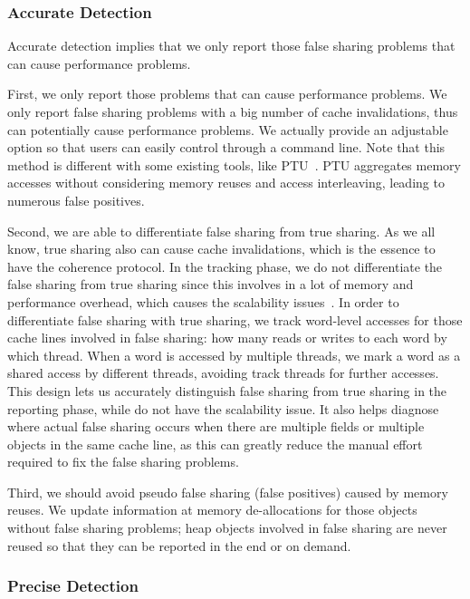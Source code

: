 \subsubsection{Accurate Detection}
\label{sec:accuratedetect}

Accurate detection implies that we only report those false sharing problems that can cause performance problems. 

First, we only report those problems that can cause performance problems. We only report false sharing problems with a big number of cache invalidations, thus can potentially cause performance problems. We actually provide an adjustable option so that users can easily control through a command line. Note that this method is different with some existing tools, like PTU~\cite{detect:ptu, detect:intel}. PTU aggregates memory accesses without considering memory reuses and access interleaving, leading to numerous false positives. 

Second, we are able to differentiate false sharing from true sharing. As we all know, true sharing also can cause cache invalidations, which is the essence to have the coherence protocol. In the tracking phase, we do not differentiate the false sharing from true sharing since this involves in a lot of memory and performance overhead, which causes the scalability issues~\cite{qinzhao}. In order to differentiate false sharing with true sharing, we track word-level accesses for those cache lines involved in false sharing: how many reads or writes to each word by which thread. When a word is accessed by multiple threads, we mark a word as a shared access by different threads, avoiding track threads for further accesses. This design lets us accurately distinguish false sharing from true sharing in the reporting phase, while do not have the scalability issue. It also helps diagnose where actual false sharing occurs when there are multiple fields or multiple objects in the same cache line, as this can greatly reduce the manual effort required to fix the false sharing problems.
  
Third, we should avoid pseudo false sharing (false positives) caused by memory reuses.  We update information at memory de-allocations for those objects without false sharing problems; heap objects involved in false sharing are never reused so that they can be reported in the end or on demand. 

\subsubsection{Precise Detection}
\label{sec:precisedetect}


